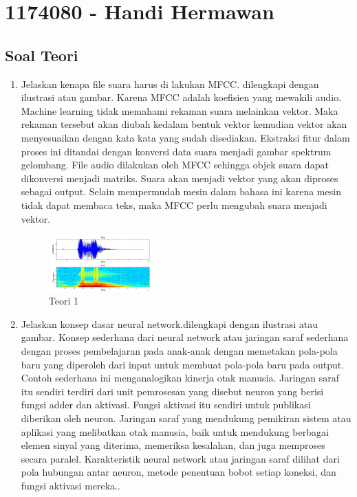 \section{1174080 - Handi Hermawan}
\subsection{Soal Teori}
\begin{enumerate}

	\item Jelaskan kenapa file suara harus di lakukan MFCC. dilengkapi dengan ilustrasi atau gambar.
	\hfill\break
	Karena MFCC adalah koefisien yang mewakili audio. Machine learning tidak memahami rekaman suara melainkan vektor. Maka rekaman tersebut akan diubah kedalam bentuk vektor kemudian vektor akan menyesuaikan dengan kata kata yang sudah disediakan. Ekstraksi fitur dalam proses ini ditandai dengan konversi data suara menjadi gambar spektrum gelombang. File audio dilakukan oleh MFCC sehingga objek suara dapat dikonversi menjadi matriks. Suara akan menjadi vektor yang akan diproses sebagai output. Selain mempermudah mesin dalam bahasa ini karena mesin tidak dapat membaca teks, maka MFCC perlu mengubah suara menjadi vektor.  

	\begin{figure}[H]
	\centering
		\includegraphics[width=4cm]{figures/1174080/6/materi/teori1.PNG}
		\caption{Teori 1}
	\end{figure}

	\item Jelaskan konsep dasar neural network.dilengkapi dengan ilustrasi atau gambar.
	\hfill\break
	Konsep sederhana dari neural network atau jaringan saraf sederhana dengan proses pembelajaran pada anak-anak dengan memetakan pola-pola baru yang diperoleh dari input untuk membuat pola-pola baru pada output. Contoh sederhana ini menganalogikan kinerja otak manusia. Jaringan saraf itu sendiri terdiri dari unit pemrosesan yang disebut neuron yang berisi fungsi adder dan aktivasi. Fungsi aktivasi itu sendiri untuk publikasi diberikan oleh neuron. Jaringan saraf yang mendukung pemikiran sistem atau aplikasi yang melibatkan otak manusia, baik untuk mendukung berbagai elemen sinyal yang diterima, memeriksa kesalahan, dan juga memproses secara paralel. Karakteristik neural network atau jaringan saraf dilihat dari pola hubungan antar neuron, metode penentuan bobot setiap koneksi, dan fungsi aktivasi mereka..  


\end{enumerate}
